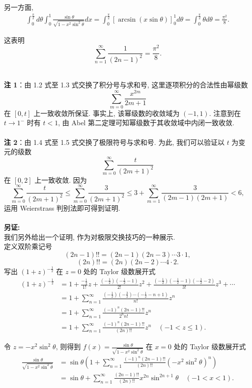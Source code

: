 \documentclass[11pt,a4paper,openany,oneside]{book}
\begin{document}
另一方面, 
\begin{align*}
\int_{0}^{\frac{\pi}{2}}d\theta\int_{0}^{1}\frac{\sin\theta }{\sqrt{1-x^2 \sin ^2\theta }}dx
=\int_{0}^{\frac{\pi}{2}}\left[\arcsin(x\sin\theta)\right]_0^1d\theta
=\int_{0}^{\frac{\pi}{2}}\theta d\theta=\frac{\pi^2}{8}	.
\end{align*}

这表明
\[\sum\limits_{n=1}^{\infty}\dfrac{1}{(2n-1)^2}=\dfrac{\pi^2}{8}.\]

~\\

\textbf{注 1}：由 1.2 式至 1.3 式交换了积分号与求和号, 这里逐项积分的合法性由幂级数 \[\sum\limits_{m=0}^{\infty}\dfrac{x^{2m}}{2m+1}\]
在 $[0,t]$ 上一致收敛所保证. 事实上, 该幂级数的收敛域为 $(-1,1)$. 注意到在 $t\to 1^{-}$ 时有 $t<1$, 由 Abel 第二定理可知幂级数于其收敛域中内闭一致收敛.\\
~\\
\textbf{注 2}：由 1.4 式至 1.5 式交换了极限符号与求和号. 为此, 我们可以验证以 $t$ 为变元的级数
\[
\sum_{m=0}^{\infty}\frac{t}{(2m+1)^2}
\]
在 $[0,2]$ 上一致收敛. 因为
\[
\sum_{m=0}^{\infty}\frac{t}{(2m+1)^2}\le\sum_{m=0}^{\infty}\frac{3}{(2m+1)^2}\le3+\sum_{m=1}^{\infty}\frac{3}{(2m-1)(2m+1)}<6,
\]
运用 Weierstrass 判别法即可得到证明.
~\\
~\\

\textbf{另证:}\\
我们另外给出一个证明, 作为对极限交换技巧的一种展示.\\
定义双阶乘记号
\[
(2n-1)!!=(2n-1)(2n-3)\cdots3\cdot1,
\]
\[
(2n)!!=(2n)(2n-2)\cdots4\cdot2.
\]
写出 $(1+z)^{-\frac{1}{2}}$ 在 $z=0$ 处的 Taylor 级数展开式
\begin{align*}
(1+z)^{-\frac{1}{2}}&=1+\frac{-\frac{1}{2}}{1!}z+\frac{(-\frac{1}{2})(-\frac{1}{2}-1)}{2!}z^2+\frac{(-\frac{1}{2})(-\frac{1}{2}-1)(-\frac{1}{2}-2)}{3!}z^3+\cdots\\
&=1+\sum_{n=1}^{\infty}\frac{(-\frac{1}{2})(-\frac{3}{2})\cdots(-\frac{1}{2}-n+1)}{n!}z^n\\
&=1+\sum_{n=1}^{\infty}\frac{(-1)^n(2n-1)!!}{2^n n!}z^n\\
&=1+\sum_{n=1}^{\infty}\frac{(-1)^n(2n-1)!!}{(2n)!!}z^n\quad (-1<z\le 1).
\end{align*}


令 $z=-x^2 \sin ^2\theta$, 则得到 $f(x)=\frac{\sin\theta }{\sqrt{1-x^2 \sin ^2\theta }}$ 在 $x=0$ 处的 Taylor 级数展开式
\begin{align*}
\frac{\sin\theta }{\sqrt{1-x^2 \sin ^2\theta }}&=\sin\theta\left(1+\sum_{n=1}^{\infty}\frac{(-1)^n(2n-1)!!}{(2n)!!}(-x^2 \sin ^2\theta)^n\right)\\
&=\sin\theta+\sum_{n=1}^{\infty}\frac{(2n-1)!!}{(2n)!!}x^{2n} \sin ^{2n+1}\theta\quad(-1<x<1).
\end{align*}
\end{document}

